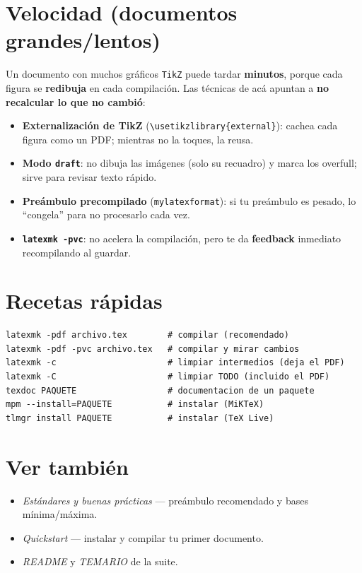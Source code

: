 \documentclass[11pt,a4paper]{article}
\newcommand{\C}[1]{\texttt{\textbackslash #1}}
\begin{document}
\section{Velocidad (documentos grandes/lentos)}
Un documento con muchos gráficos \texttt{TikZ} puede tardar \textbf{minutos},
porque cada figura se \textbf{redibuja} en cada compilación. Las técnicas de acá
apuntan a \textbf{no recalcular lo que no cambió}:
\begin{itemize}[noitemsep]
  \item \textbf{Externalización de TikZ} (\C{usetikzlibrary\{external\}}): cachea
        cada figura como un PDF; mientras no la toques, la reusa.
  \item \textbf{Modo \texttt{draft}}: no dibuja las imágenes (solo su recuadro) y
        marca los overfull; sirve para revisar texto rápido.
  \item \textbf{Preámbulo precompilado} (\texttt{mylatexformat}): si tu preámbulo
        es pesado, lo \enquote{congela} para no procesarlo cada vez.
  \item \textbf{\texttt{latexmk -pvc}}: no acelera la compilación, pero te da
        \textbf{feedback} inmediato recompilando al guardar.
\end{itemize}

\section{Recetas rápidas}
\begin{lstlisting}
latexmk -pdf archivo.tex        # compilar (recomendado)
latexmk -pdf -pvc archivo.tex   # compilar y mirar cambios
latexmk -c                      # limpiar intermedios (deja el PDF)
latexmk -C                      # limpiar TODO (incluido el PDF)
texdoc PAQUETE                  # documentacion de un paquete
mpm --install=PAQUETE           # instalar (MiKTeX)
tlmgr install PAQUETE           # instalar (TeX Live)
\end{lstlisting}

\section*{Ver también}
\begin{itemize}[noitemsep]
  \item \emph{Estándares y buenas prácticas} — preámbulo recomendado y bases
        mínima/máxima.
  \item \emph{Quickstart} — instalar y compilar tu primer documento.
  \item \emph{README} y \emph{TEMARIO} de la suite.
\end{itemize}
\end{document}
